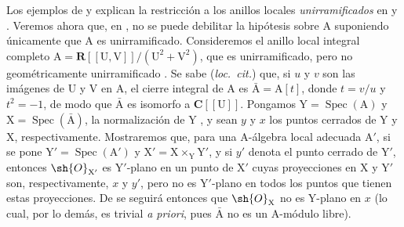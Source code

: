 \begin{env}[11.7.5]
\label{IV.11.7.5}
Los ejemplos de  y  explican la restricción a los anillos locales \emph{unirramificados} en  y .
Veremos ahora que, en , no se puede debilitar la hipótesis sobre $\mathrm{A}$ suponiendo únicamente que $\mathrm{A}$ es unirramificado.
Consideremos el anillo local integral completo $\mathrm{A}=\mathbf{R}[[\mathrm{U},\mathrm{V}]]/(\mathrm{U}^2+\mathrm{V}^2)$, que es unirramificado, pero no geométricamente unirramificado .
Se sabe (\emph{loc.\ cit.}) que, si $u$ y $v$ son las imágenes de $\mathrm{U}$ y $\mathrm{V}$ en $\mathrm{A}$, el cierre integral de $\mathrm{A}$ es $\bar{\mathrm{A}}=\mathrm{A}[t]$, donde $t=v/u$ y $t^2=-1$, de modo que $\bar{\mathrm{A}}$ es isomorfo a $\mathbf{C}[[\mathrm{U}]]$.
Pongamos $\mathrm{Y}=\operatorname{Spec}(\mathrm{A})$ y $\mathrm{X}=\operatorname{Spec}(\bar{\mathrm{A}})$, la normalización de $\mathrm{Y}$ , y sean $y$ y $x$ los puntos cerrados de $\mathrm{Y}$ y $\mathrm{X}$, respectivamente.
Mostraremos que, para una $\mathrm{A}$-álgebra local adecuada $\mathrm{A}'$, si se pone $\mathrm{Y}'=\operatorname{Spec}(\mathrm{A}')$ y $\mathrm{X}'=\mathrm{X}\times_\mathrm{Y}\mathrm{Y}'$, y si $y'$ denota el punto cerrado de $\mathrm{Y}'$, entonces $\sh{O}_{\mathrm{X}'}$ es $\mathrm{Y}'$-plano en un punto de $\mathrm{X}'$ cuyas proyecciones en $\mathrm{X}$ y $\mathrm{Y}'$ son, respectivamente, $x$ y $y'$, pero no es $\mathrm{Y}'$-plano en todos los puntos que tienen estas proyecciones.
De  se seguirá entonces que $\sh{O}_\mathrm{X}$ no es $\mathrm{Y}$-plano en $x$ (lo cual, por lo demás, es trivial \emph{a priori}, pues $\bar{\mathrm{A}}$ no es un $\mathrm{A}$-módulo libre).


\end{env}
